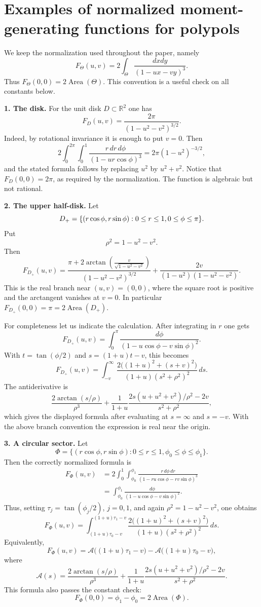 \documentclass[10pt,a4paper,reqno]{amsart}
\newcommand {\bR} {\mathbb R}
\theoremstyle{plain}
\theoremstyle{definition}
\begin{document}
\section{Examples of normalized moment-generating functions for polypols}

We keep the normalization used throughout the paper, namely
\[
        F_\Theta(u,v)=2\int_\Theta\frac{dxdy}{(1-ux-vy)^3}.
\]
Thus $F_\Theta(0,0)=2\operatorname{Area}(\Theta)$.  This convention is a useful check on all constants below.

{\bf 1. The disk.}  For the unit disk $D\subset\bR^2$ one has
\[
        F_D(u,v)=\frac{2\pi}{(1-u^2-v^2)^{3/2}} .
\]
Indeed, by rotational invariance it is enough to put $v=0$.  Then
\[
2\int_0^{2\pi}\int_0^1\frac{r\,dr\,d\phi}{(1-ur\cos\phi)^3}
       =2\pi(1-u^2)^{-3/2},
\]
and the stated formula follows by replacing $u^2$ by $u^2+v^2$.  Notice that
$F_D(0,0)=2\pi$, as required by the normalization.  The function is algebraic but not rational.

{\bf 2. The upper half-disk.}  Let
\[
        D_+=\{(r\cos\phi,r\sin\phi):0\le r\le1,\\ 0\le\phi\le\pi\}.
\]
Put
\[
        \rho^2=1-u^2-v^2.
\]
Then
\[
\boxed{
        F_{D_+}(u,v)=
        \frac{\pi+2\arctan\!\left(\frac{v}{\sqrt{1-u^2-v^2}}\right)}{(1-u^2-v^2)^{3/2}}
        +\frac{2v}{(1-u^2)(1-u^2-v^2)} .}
\]
This is the real branch near $(u,v)=(0,0)$, where the square root is positive and the arctangent vanishes at $v=0$.  In particular
$F_{D_+}(0,0)=\pi=2\operatorname{Area}(D_+)$.

For completeness let us indicate the calculation.  After integrating in $r$ one gets
\[
 F_{D_+}(u,v)=\int_0^\pi\frac{d\phi}{(1-u\cos\phi-v\sin\phi)^2}.
\]
With $t=\tan(\phi/2)$ and $s=(1+u)t-v$, this becomes
\[
F_{D_+}(u,v)=\int_{-v}^{\infty}
  \frac{2\big((1+u)^2+(s+v)^2\big)}{(1+u)(s^2+\rho^2)^2}\,ds .
\]
The antiderivative is
\[
\frac{2\arctan(s/\rho)}{\rho^3}
+\frac{1}{1+u}\frac{2s(u+u^2+v^2)/\rho^2-2v}{s^2+\rho^2},
\]
which gives the displayed formula after evaluating at $s=\infty$ and $s=-v$.
With the above branch convention the expression is real near the origin.

{\bf 3. A circular sector.}  Let
\[
\Phi=\{(r\cos\phi,r\sin\phi):0\le r\le1,
       \phi_0\le\phi\le\phi_1\}.
\]
Then the correctly normalized formula is
\[
\begin{aligned}
F_\Phi(u,v)
&=2\int_0^1\int_{\phi_0}^{\phi_1}
       \frac{r\,d\phi\,dr}{(1-r u\cos\phi-rv\sin\phi)^3}  \\
&=\int_{\phi_0}^{\phi_1}
       \frac{d\phi}{(1-u\cos\phi-v\sin\phi)^2} .
\end{aligned}
\]
Thus, setting $\tau_j=\tan(\phi_j/2)$, $j=0,1$, and again
$\rho^2=1-u^2-v^2$, one obtains
\[
F_\Phi(u,v)=
\int_{(1+u)\tau_0-v}^{(1+u)\tau_1-v}
  \frac{2\big((1+u)^2+(s+v)^2\big)}{(1+u)(s^2+\rho^2)^2}\,ds .
\]
Equivalently,
\[
F_\Phi(u,v)=\mathcal A\big((1+u)\tau_1-v\big)
             -\mathcal A\big((1+u)\tau_0-v\big),
\]
where
\[
\mathcal A(s)=
\frac{2\arctan(s/\rho)}{\rho^3}
+\frac{1}{1+u}\frac{2s(u+u^2+v^2)/\rho^2-2v}{s^2+\rho^2} .
\]
This formula also passes the constant check:
\[
        F_\Phi(0,0)=\phi_1-
        \phi_0=2\operatorname{Area}(\Phi).
\]
\end{document}
